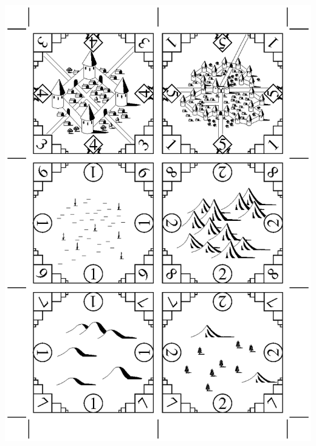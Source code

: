 \documentclass[12pt]{article}
\begin{document}
\begin{center}
\includegraphics[width=7in]{tile_sheet_2.eps}

\vfill

\newpage

~\vfill


\end{center}
\end{document}

